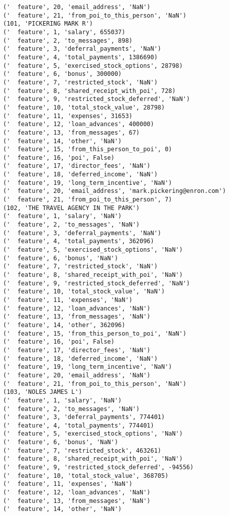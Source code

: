\begin{verbatim}
('  feature', 20, 'email_address', 'NaN')
('  feature', 21, 'from_poi_to_this_person', 'NaN')
(101, 'PICKERING MARK R')
('  feature', 1, 'salary', 655037)
('  feature', 2, 'to_messages', 898)
('  feature', 3, 'deferral_payments', 'NaN')
('  feature', 4, 'total_payments', 1386690)
('  feature', 5, 'exercised_stock_options', 28798)
('  feature', 6, 'bonus', 300000)
('  feature', 7, 'restricted_stock', 'NaN')
('  feature', 8, 'shared_receipt_with_poi', 728)
('  feature', 9, 'restricted_stock_deferred', 'NaN')
('  feature', 10, 'total_stock_value', 28798)
('  feature', 11, 'expenses', 31653)
('  feature', 12, 'loan_advances', 400000)
('  feature', 13, 'from_messages', 67)
('  feature', 14, 'other', 'NaN')
('  feature', 15, 'from_this_person_to_poi', 0)
('  feature', 16, 'poi', False)
('  feature', 17, 'director_fees', 'NaN')
('  feature', 18, 'deferred_income', 'NaN')
('  feature', 19, 'long_term_incentive', 'NaN')
('  feature', 20, 'email_address', 'mark.pickering@enron.com')
('  feature', 21, 'from_poi_to_this_person', 7)
(102, 'THE TRAVEL AGENCY IN THE PARK')
('  feature', 1, 'salary', 'NaN')
('  feature', 2, 'to_messages', 'NaN')
('  feature', 3, 'deferral_payments', 'NaN')
('  feature', 4, 'total_payments', 362096)
('  feature', 5, 'exercised_stock_options', 'NaN')
('  feature', 6, 'bonus', 'NaN')
('  feature', 7, 'restricted_stock', 'NaN')
('  feature', 8, 'shared_receipt_with_poi', 'NaN')
('  feature', 9, 'restricted_stock_deferred', 'NaN')
('  feature', 10, 'total_stock_value', 'NaN')
('  feature', 11, 'expenses', 'NaN')
('  feature', 12, 'loan_advances', 'NaN')
('  feature', 13, 'from_messages', 'NaN')
('  feature', 14, 'other', 362096)
('  feature', 15, 'from_this_person_to_poi', 'NaN')
('  feature', 16, 'poi', False)
('  feature', 17, 'director_fees', 'NaN')
('  feature', 18, 'deferred_income', 'NaN')
('  feature', 19, 'long_term_incentive', 'NaN')
('  feature', 20, 'email_address', 'NaN')
('  feature', 21, 'from_poi_to_this_person', 'NaN')
(103, 'NOLES JAMES L')
('  feature', 1, 'salary', 'NaN')
('  feature', 2, 'to_messages', 'NaN')
('  feature', 3, 'deferral_payments', 774401)
('  feature', 4, 'total_payments', 774401)
('  feature', 5, 'exercised_stock_options', 'NaN')
('  feature', 6, 'bonus', 'NaN')
('  feature', 7, 'restricted_stock', 463261)
('  feature', 8, 'shared_receipt_with_poi', 'NaN')
('  feature', 9, 'restricted_stock_deferred', -94556)
('  feature', 10, 'total_stock_value', 368705)
('  feature', 11, 'expenses', 'NaN')
('  feature', 12, 'loan_advances', 'NaN')
('  feature', 13, 'from_messages', 'NaN')
('  feature', 14, 'other', 'NaN')

\end{verbatim}

